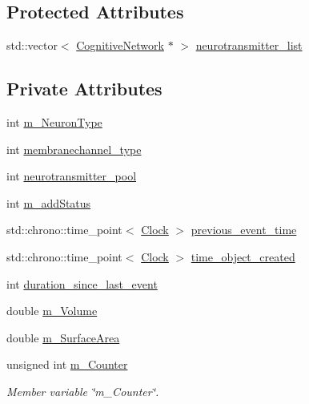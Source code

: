 \subsection*{Protected Attributes}
\begin{DoxyCompactItemize}
\item 
std\+::vector$<$ \mbox{\hyperlink{classCognitiveNetwork}{Cognitive\+Network}} $\ast$ $>$ \mbox{\hyperlink{classMembraneChannel_ad603f58813157b33ca81b919cf9c2897}{neurotransmitter\+\_\+list}}
\end{DoxyCompactItemize}
\subsection*{Private Attributes}
\begin{DoxyCompactItemize}
\item 
int \mbox{\hyperlink{classMembraneChannel_aa8beeb2908b603d7b568442b635f4164}{m\+\_\+\+Neuron\+Type}}
\item 
int \mbox{\hyperlink{classMembraneChannel_a99646a50163299948faa5a5f0da60add}{membranechannel\+\_\+type}}
\item 
int \mbox{\hyperlink{classMembraneChannel_a79af5f43970e9496ea293c9ac8bb73f6}{neurotransmitter\+\_\+pool}}
\item 
int \mbox{\hyperlink{classMembraneChannel_aaabe065df6250159df3ee8b9ea3f824f}{m\+\_\+add\+Status}}
\item 
std\+::chrono\+::time\+\_\+point$<$ \mbox{\hyperlink{universe_8h_a0ef8d951d1ca5ab3cfaf7ab4c7a6fd80}{Clock}} $>$ \mbox{\hyperlink{classMembraneChannel_a05a2ea08d814a99d1c349dab4b5f3266}{previous\+\_\+event\+\_\+time}}
\item 
std\+::chrono\+::time\+\_\+point$<$ \mbox{\hyperlink{universe_8h_a0ef8d951d1ca5ab3cfaf7ab4c7a6fd80}{Clock}} $>$ \mbox{\hyperlink{classMembraneChannel_a16fbba2c7aaf591b3a1d012b745ee97a}{time\+\_\+object\+\_\+created}}
\item 
int \mbox{\hyperlink{classMembraneChannel_ad6b972a3874ddc236b63c7145123e0c2}{duration\+\_\+since\+\_\+last\+\_\+event}}
\item 
double \mbox{\hyperlink{classMembraneChannel_af542b034258dce62f0666b0397fdd2fb}{m\+\_\+\+Volume}}
\item 
double \mbox{\hyperlink{classMembraneChannel_a85b55287517ff9d5cacb98bacf79a0d3}{m\+\_\+\+Surface\+Area}}
\item 
unsigned int \mbox{\hyperlink{classMembraneChannel_a0df3b8e24bd5d496d2832b486b35aab1}{m\+\_\+\+Counter}}
\begin{DoxyCompactList}\small\item\em Member variable \char`\"{}m\+\_\+\+Counter\char`\"{}. \end{DoxyCompactList}\item 

\end{DoxyCompactItemize}
